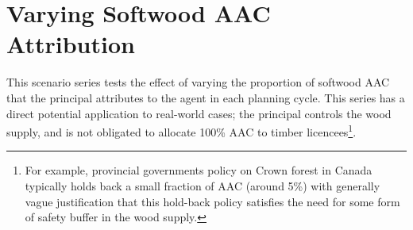 



\section{Varying Softwood AAC Attribution}
\label{sec:scenario_series_4}

This scenario series tests the effect of varying the proportion of softwood AAC that the principal attributes to the agent in each planning cycle. This series has a direct potential application to real-world cases; the principal controls the wood supply, and is not obligated to allocate 100\% AAC to timber licencees\footnote{For example, provincial governments policy on Crown forest in Canada typically holds back a small fraction of AAC (around 5\%) with generally vague justification that this hold-back policy satisfies the need for some form of safety buffer in the wood supply.}.

